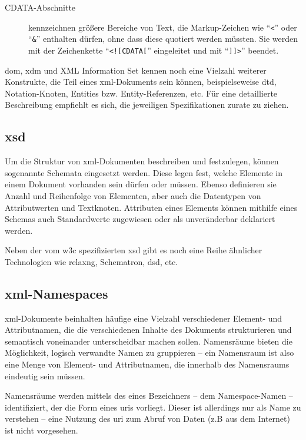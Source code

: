 \begin{description}
    \item[CDATA-Abschnitte] kennzeichnen größere Bereiche von Text, die Markup-Zeichen wie \enquote{\texttt{<}} oder \enquote{\texttt{\&}} enthalten dürfen, ohne dass diese quotiert werden müssten. Sie werden mit der Zeichenkette \enquote{\texttt{<![CDATA[}} eingeleitet und mit \enquote{\texttt{]]>}} beendet.\cite[Abschnitt 2.7]{maler2008xml}
\end{description}

\gls{dom}, \acrshort{xdm} und XML Information Set kennen noch eine Vielzahl weiterer Konstrukte, die Teil eines \acrshort{xml}-Dokuments sein können, beispielseweise \acrfull{dtd}, Notation-Knoten, Entities bzw. Entity-Referenzen, etc. Für eine detaillierte Beschreibung empfiehlt es sich, die jeweiligen Spezifikationen zurate zu ziehen.\cite{dom,xmlinfoset,xdm,maler2008xml}

\subsection{\acrfull{xsd}}

Um die Struktur von \acrshort{xml}-Dokumenten beschreiben und festzulegen, können sogenannte Schemata eingesetzt werden. Diese legen fest, welche Elemente in einem Dokument vorhanden sein dürfen oder müssen. Ebenso definieren sie Anzahl und Reihenfolge von Elementen, aber auch die Datentypen von Attributwerten und Textknoten. Attributen eines Elements können mithilfe eines Schemas auch Standardwerte zugewiesen oder als unveränderbar deklariert werden.

Neben der vom \gls{w3c} spezifizierten \acrfull{xsd} gibt es noch eine Reihe ähnlicher Technologien wie \acrshort{relaxng}, Schematron, \gls{dsd}, etc.

\subsection{\acrshort{xml}-Namespaces}
\label{sec:xmlns}

\acrshort{xml}-Dokumente beinhalten häufige eine Vielzahl verschiedener Element- und Attributnamen, die die verschiedenen Inhalte des Dokuments strukturieren und semantisch voneinander unterscheidbar machen sollen. Namensräume bieten die Möglichkeit, logisch verwandte Namen zu gruppieren -- ein Namensraum ist also eine Menge von Element- und Attributnamen, die innerhalb des Namensraums eindeutig sein müssen.

Namensräume werden mittels des eines Bezeichners -- dem Namespace-Namen -- identifiziert, der die Form eines \glspl{uri} vorliegt. Dieser ist allerdings nur als Name zu verstehen -- eine Nutzung des \gls{uri} zum Abruf von Daten (z.B aus dem Internet) ist nicht vorgesehen.

